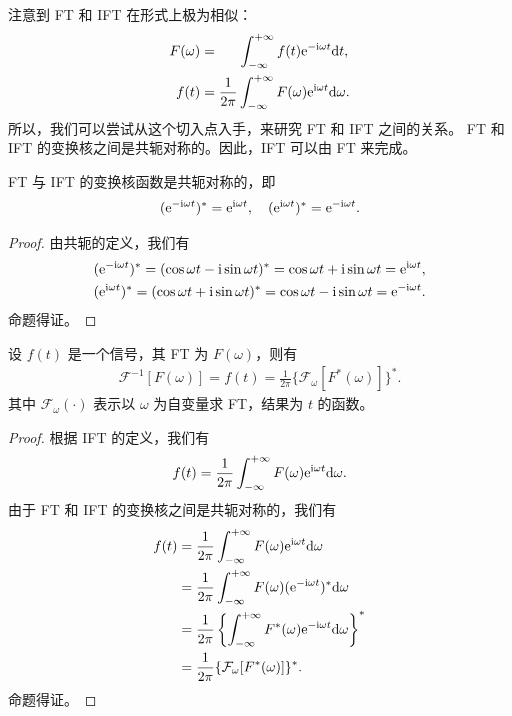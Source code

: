 注意到 FT 和 IFT 在形式上极为相似：
\begin{align*}
    F(\omega) & = \quad\;\; \int_{-\infty}^{+\infty} f(t)\mathrm{e}^{-\mathrm{i}\omega t}\mathrm{d}t, \\
    f(t) & = \frac{1}{2\pi} \int_{-\infty}^{+\infty} F(\omega)\mathrm{e}^{\mathrm{i}\omega t}\mathrm{d}\omega.
\end{align*}
所以，我们可以尝试从这个切入点入手，来研究 FT 和 IFT 之间的关系。
FT 和 IFT 的变换核之间是共轭对称的。因此，IFT 可以由 FT 来完成。

\begin{lemma}
    FT 与 IFT 的变换核函数是共轭对称的，即
    \begin{align*}
        (\mathrm{e}^{-\mathrm{i}\omega t})^* = \mathrm{e}^{\mathrm{i}\omega t}, \quad
        (\mathrm{e}^{\mathrm{i}\omega t})^* = \mathrm{e}^{-\mathrm{i}\omega t}.
    \end{align*}
\end{lemma}

\begin{proof}
    由共轭的定义，我们有
    \begin{align*}
        (\mathrm{e}^{-\mathrm{i}\omega t})^* = (\cos\omega t - \mathrm{i}\sin\omega t)^* = \cos\omega t + \mathrm{i}\sin\omega t = \mathrm{e}^{\mathrm{i}\omega t}, \\
        (\mathrm{e}^{\mathrm{i}\omega t})^* = (\cos\omega t + \mathrm{i}\sin\omega t)^* = \cos\omega t - \mathrm{i}\sin\omega t = \mathrm{e}^{-\mathrm{i}\omega t}.
    \end{align*}
    命题得证。
\end{proof}

\begin{theorem}
    设 $f(t)$ 是一个信号，其 FT 为 $F(\omega)$，则有
    \begin{align*}
        \mathcal{F}^{-1}[F(\omega)] = f(t) = \frac{1}{2\pi}\{\mathcal{F}_{\omega}[F^*(\omega)]\}^*.
    \end{align*}
    其中 $\mathcal{F}_\omega(\cdot)$ 表示以 $\omega$ 为自变量求 FT，结果为 $t$ 的函数。
\end{theorem}

\begin{proof}
    根据 IFT 的定义，我们有
    \begin{align*}
        f(t) = \frac{1}{2\pi} \int_{-\infty}^{+\infty} F(\omega)\mathrm{e}^{\mathrm{i}\omega t}\mathrm{d}\omega.
    \end{align*}
    由于 FT 和 IFT 的变换核之间是共轭对称的，我们有
    \begin{align*}
        f(t) & = \frac{1}{2\pi} \int_{-\infty}^{+\infty} F(\omega)\mathrm{e}^{\mathrm{i}\omega t}\mathrm{d}\omega \\
        & = \frac{1}{2\pi} \int_{-\infty}^{+\infty} F(\omega)(\mathrm{e}^{-\mathrm{i}\omega t})^*\mathrm{d}\omega \\
        & = \frac{1}{2\pi} \left\{\int_{-\infty}^{+\infty} F^*(\omega)\mathrm{e}^{-\mathrm{i}\omega t}\mathrm{d}\omega\right\}^* \\
        & = \frac{1}{2\pi}\{\mathcal{F}_{\omega}[F^*(\omega)]\}^*.
    \end{align*}
    命题得证。
\end{proof}

